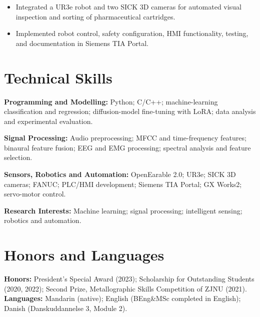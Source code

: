 \documentclass[a4paper,11pt]{article}
\newcommand{\resumeItemListStart}{%
  \begin{itemize}[
    leftmargin=1.25em,
    label=\textendash,
    itemsep=0.20em,
    topsep=0.20em,
    parsep=0pt,
    partopsep=0pt
  ]
}
\newcommand{\resumeItemListEnd}{\end{itemize}}
\newcommand{\resumeItem}[1]{\item \small #1}
\newcommand{\skillItem}[2]{%
  \noindent\small\textbf{#1:} #2\par\vspace{0.25em}
}
\begin{document}
\resumeItemListStart
  \resumeItem{Integrated a UR3e robot and two SICK 3D cameras for automated visual inspection and sorting of pharmaceutical cartridges.}
  \resumeItem{Implemented robot control, safety configuration, HMI functionality, testing, and documentation in Siemens TIA Portal.}
\resumeItemListEnd

\section{Technical Skills}

\skillItem{Programming and Modelling}{Python; C/C++; machine-learning classification and regression; diffusion-model fine-tuning with LoRA; data analysis and experimental evaluation.}
\skillItem{Signal Processing}{Audio preprocessing; MFCC and time-frequency features; binaural feature fusion; EEG and EMG processing; spectral analysis and feature selection.}
\skillItem{Sensors, Robotics and Automation}{OpenEarable 2.0; UR3e; SICK 3D cameras; FANUC; PLC/HMI development; Siemens TIA Portal; GX Works2; servo-motor control.}
\skillItem{Research Interests}{Machine learning; signal processing; intelligent sensing; robotics and automation.}

\section{Honors and Languages}

\small
\textbf{Honors:} President's Special Award (2023); Scholarship for Outstanding Students (2020, 2022); Second Prize, Metallographic Skills Competition of ZJNU (2021).\\[0.24em]
\textbf{Languages:} Mandarin (native); English (BEng\&MSc completed in English); Danish (Danskuddannelse 3, Module 2).
\normalsize
\end{document}
